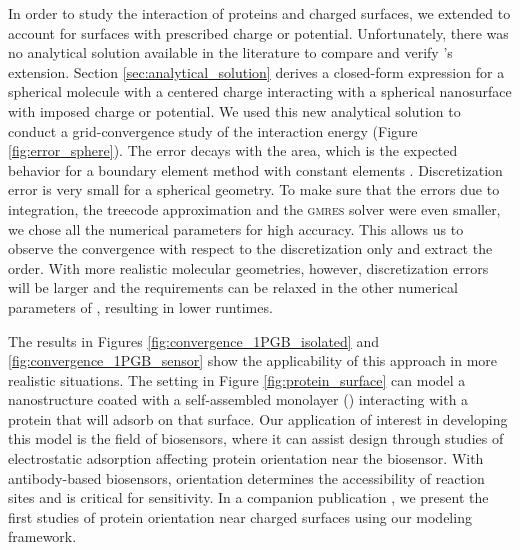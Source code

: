 
In order to study the interaction of proteins and charged surfaces, we extended \pygbe to account for surfaces with prescribed charge or potential. Unfortunately, there was no analytical solution available in the literature to compare and verify \pygbe's extension. 
Section \ref{sec:analytical_solution} derives a closed-form expression for a spherical molecule with a centered charge interacting with a spherical nanosurface with imposed charge or potential.
We used this new analytical solution to conduct a grid-convergence study of the interaction energy (Figure \ref{fig:error_sphere}). The error decays with the area, which is the expected behavior for a boundary element method with constant elements \cite{CooperBardhanBarba2013, CooperBarba-share154331}. 
Discretization error is very small for a spherical geometry. To make sure that the errors due to integration, the treecode approximation and the \textsc{gmres} solver were even smaller, we chose all the numerical parameters for high accuracy. This allows us to observe the convergence with respect to the discretization only and extract the order. With more realistic molecular geometries, however, discretization errors will be larger and the requirements can be relaxed in the other numerical parameters of \pygbe, resulting in lower runtimes.


The results in Figures \ref{fig:convergence_1PGB_isolated} and \ref{fig:convergence_1PGB_sensor} show the applicability of this approach in more realistic situations. The setting in Figure \ref{fig:protein_surface} can model a nanostructure coated with a self-assembled monolayer (\sam) interacting with a protein that will adsorb on that surface. Our application of interest in developing this model is the field of biosensors, where it can assist design through studies of electrostatic adsorption affecting protein orientation near the biosensor. With antibody-based biosensors, orientation determines the accessibility of reaction sites and is critical for sensitivity. In a companion publication \cite{CooperClementiBarba2015}, we present the first studies of protein orientation near charged surfaces using our modeling framework.

